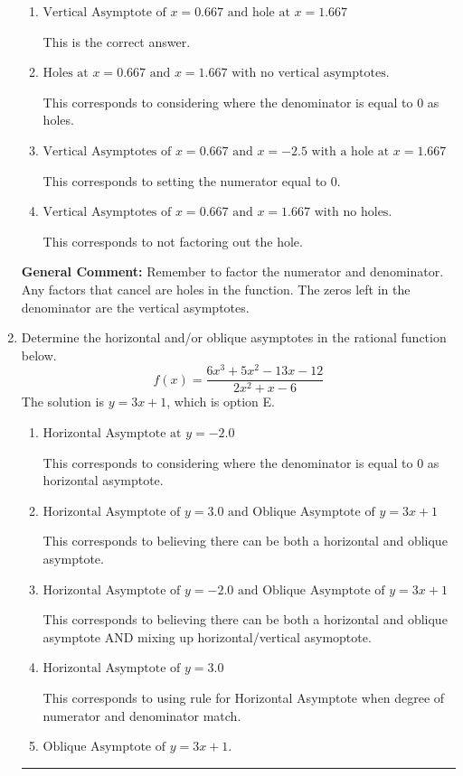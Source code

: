 \documentclass{extbook}[14pt]
\newcommand{\litem}[1]{\item #1

\rule{\textwidth}{0.4pt}}
\begin{document}
\begin{enumerate}
{\begin{enumerate}[label=\Alph*.]
This corresponds to mixing vertical and horizontal asymptotes.
\item \( \text{Vertical Asymptote of } x = 0.667 \text{ and hole at } x = 1.667 \)

This is the correct answer.
\item \( \text{Holes at } x = 0.667 \text{ and } x = 1.667 \text{ with no vertical asymptotes.} \)

This corresponds to considering where the denominator is equal to 0 as holes.
\item \( \text{Vertical Asymptotes of } x = 0.667 \text{ and } x = -2.5 \text{ with a hole at } x = 1.667 \)

This corresponds to setting the numerator equal to 0.
\item \( \text{Vertical Asymptotes of } x = 0.667 \text{ and } x = 1.667 \text{ with no holes.} \)

This corresponds to not factoring out the hole.
\end{enumerate}

\textbf{General Comment:} Remember to factor the numerator and denominator. Any factors that cancel are holes in the function. The zeros left in the denominator are the vertical asymptotes.
}
\litem{
Determine the horizontal and/or oblique asymptotes in the rational function below.
\[ f(x) = \frac{6x^{3} +5 x^{2} -13 x -12}{2x^{2} +x -6} \]The solution is \( y = 3x + 1 \), which is option E.\begin{enumerate}[label=\Alph*.]
\item \( \text{Horizontal Asymptote at } y = -2.0 \)

This corresponds to considering where the denominator is equal to 0 as horizontal asymptote.
\item \( \text{Horizontal Asymptote of } y = 3.0 \text{ and Oblique Asymptote of } y = 3x + 1 \)

This corresponds to believing there can be both a horizontal and oblique asymptote.
\item \( \text{Horizontal Asymptote of } y = -2.0 \text{ and Oblique Asymptote of } y = 3x + 1 \)

This corresponds to believing there can be both a horizontal and oblique asymptote AND mixing up horizontal/vertical asymoptote.
\item \( \text{Horizontal Asymptote of } y = 3.0  \)

This corresponds to using rule for Horizontal Asymptote when degree of numerator and denominator match.
\item \( \text{Oblique Asymptote of } y = 3x + 1. \)


\end{enumerate}}
\end{enumerate}
\end{document}
